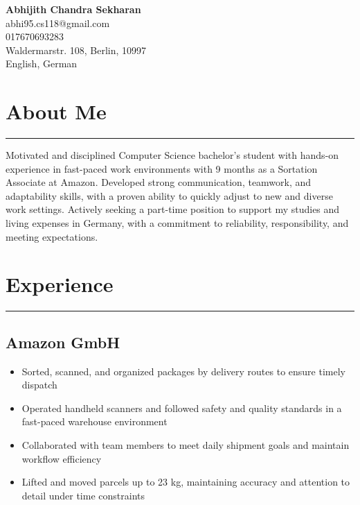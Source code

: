 \documentclass[12pt]{article}
\begin{document}
\begin{flushleft}
        \textbf{\LARGE Abhijith Chandra Sekharan}\\
     \faEnvelope\; abhi95.cs118@gmail.com\\
     \faPhone\; {017670693283}\\
     \faMapMarker\; {Waldermarstr. 108, Berlin, 10997}\\
     \faComments \; English, German
\end{flushleft}


\section{\textbf{About Me}}
\vspace{-2em}
\rule{\textwidth}{1pt}
Motivated and disciplined Computer Science bachelor's student with hands-on experience in fast-paced work environments with 9 months as a Sortation Associate at Amazon. Developed strong communication, teamwork, and adaptability skills, with a proven ability to quickly adjust to new and diverse work settings. Actively seeking a part-time position to support my studies and living expenses in Germany, with a commitment to reliability, responsibility, and meeting expectations.

\section*{\textbf{\large Experience}}
\vspace{-2em}
\rule{\textwidth}{1pt}

\subsection*{Amazon GmbH}
\begin{itemize}
    \item Sorted, scanned, and organized packages by delivery routes to ensure timely dispatch
    \item Operated handheld scanners and followed safety and quality standards in a fast-paced warehouse environment
    \item Collaborated with team members to meet daily shipment goals and maintain workflow efficiency
    \item Lifted and moved parcels up to 23 kg, maintaining accuracy and attention to detail under time constraints
\end{itemize}
\end{document}
